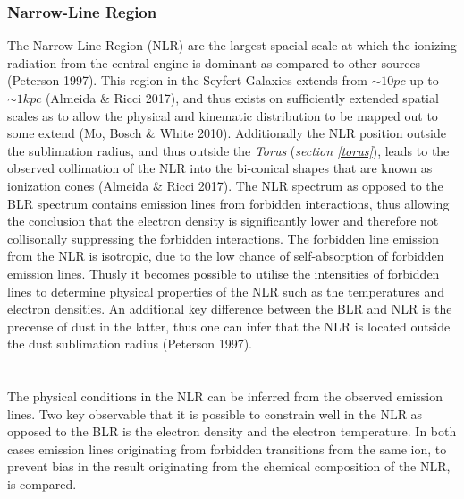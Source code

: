 \documentclass[a4paper, 12pt, twoside]{article}
\begin{document}
\subsubsection{Narrow-Line Region}
The Narrow-Line Region (NLR) are the largest spacial scale at which the ionizing radiation from the central engine is dominant as compared to other sources (Peterson 1997). This region in the Seyfert Galaxies extends from $\sim 10 pc$ up to $\sim 1 kpc$ (Almeida \& Ricci 2017\cite{Almeida2017}), and thus exists on sufficiently extended spatial scales as to allow the physical and kinematic distribution to be mapped out to some extend (Mo, Bosch \& White 2010). Additionally the NLR position outside the sublimation radius, and thus outside the \emph{Torus} (\emph{section \ref{torus}}), leads to the observed collimation of the NLR into the bi-conical shapes that are known as ionization cones (Almeida \& Ricci 2017\cite{Almeida2017}). The NLR spectrum as opposed to the BLR spectrum contains emission lines from forbidden interactions, thus allowing the conclusion that the electron density is significantly lower and therefore not collisonally suppressing the forbidden interactions. The forbidden line emission from the NLR is isotropic, due to the low chance of self-absorption of forbidden emission lines. Thusly it becomes possible to utilise the intensities of forbidden lines to determine physical properties of the NLR such as the temperatures and electron densities. An additional key difference between the BLR and NLR is the precense of dust in the latter, thus one can infer that the NLR is located outside the dust sublimation radius (Peterson 1997).\\
\\
\\
The physical conditions in the NLR can be inferred from the observed emission lines. Two key observable that it is possible to constrain well in the NLR as opposed to the BLR is the electron density and the electron temperature. In both cases emission lines originating from forbidden transitions from the same ion, to prevent bias in the result originating from the chemical composition of the NLR, is compared.
\end{document}
